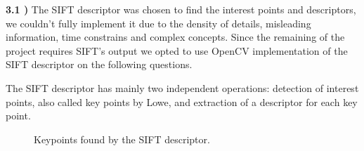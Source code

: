 \documentclass[12pt,a4paper]{article}
\begin{document}
\textbf{3.1 )} The SIFT descriptor was chosen to find the interest points and descriptors, we couldn't fully implement it due to the density of details, misleading information, time constrains and complex concepts. Since the remaining of the project requires SIFT's output we opted to use OpenCV implementation of the SIFT descriptor on the following questions.
\par
The SIFT descriptor has mainly two independent operations: detection of interest points, also called key points by Lowe, and extraction of a descriptor for each key point.

\begin{figure}[!h]
	\centering
	\quad
	\caption{Keypoints found by the SIFT descriptor.}
	\label{fig:keypoints}
\end{figure}
\end{document}
